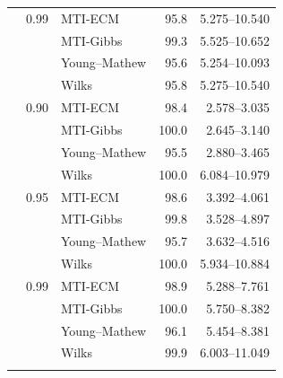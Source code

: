 \begin{longtable}{@{}rrlrr@{}}
\addlinespace[0.3em]
500 & 0.99 & MTI-ECM & 95.8 & 5.275--10.540 \\
 &  & MTI-Gibbs & 99.3 & 5.525--10.652 \\
 &  & Young--Mathew & 95.6 & 5.254--10.093 \\
 &  & Wilks & 95.8 & 5.275--10.540 \\
\addlinespace[0.3em]
1000 & 0.90 & MTI-ECM & 98.4 & 2.578--3.035 \\
 &  & MTI-Gibbs & 100.0 & 2.645--3.140 \\
 &  & Young--Mathew & 95.5 & 2.880--3.465 \\
 &  & Wilks & 100.0 & 6.084--10.979 \\
\addlinespace[0.3em]
1000 & 0.95 & MTI-ECM & 98.6 & 3.392--4.061 \\
 &  & MTI-Gibbs & 99.8 & 3.528--4.897 \\
 &  & Young--Mathew & 95.7 & 3.632--4.516 \\
 &  & Wilks & 100.0 & 5.934--10.884 \\
\addlinespace[0.3em]
1000 & 0.99 & MTI-ECM & 98.9 & 5.288--7.761 \\
 &  & MTI-Gibbs & 100.0 & 5.750--8.382 \\
 &  & Young--Mathew & 96.1 & 5.454--8.381 \\
 &  & Wilks & 99.9 & 6.003--11.049 \\
\addlinespace[0.3em]
\end{longtable}
\clearpage
